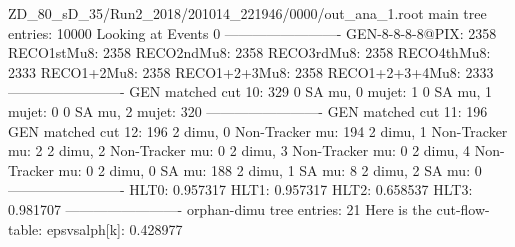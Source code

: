 ZD_80_sD_35/Run2_2018/201014_221946/0000/out_ana_1.root
main tree entries: 10000
Looking at Events 0
-------------------------
GEN-8-8-8-8@PIX: 2358
RECO1stMu8: 2358
RECO2ndMu8: 2358
RECO3rdMu8: 2358
RECO4thMu8: 2333
RECO1+2Mu8: 2358
RECO1+2+3Mu8: 2358
RECO1+2+3+4Mu8: 2333
-------------------------
GEN matched cut 10: 329
0 SA mu, 0 mujet: 1
0 SA mu, 1 mujet: 0
0 SA mu, 2 mujet: 320
-------------------------
GEN matched cut 11: 196
GEN matched cut 12: 196
2 dimu, 0 Non-Tracker mu: 194
2 dimu, 1 Non-Tracker mu: 2
2 dimu, 2 Non-Tracker mu: 0
2 dimu, 3 Non-Tracker mu: 0
2 dimu, 4 Non-Tracker mu: 0
2 dimu, 0 SA mu: 188
2 dimu, 1 SA mu: 8
2 dimu, 2 SA mu: 0
-------------------------
HLT0: 0.957317
HLT1: 0.957317
HLT2: 0.658537
HLT3: 0.981707
-------------------------
orphan-dimu tree entries: 21
Here is the cut-flow-table:
epsvsalph[k]: 0.428977
        
